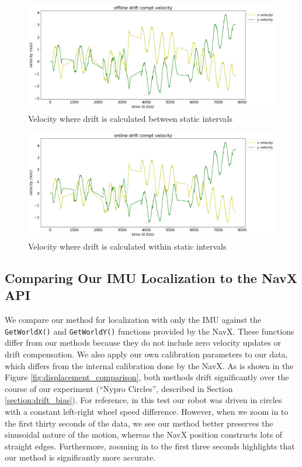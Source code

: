 \documentclass{article}
\begin{document}
      \begin{figure}[H]
        \centering
        \includegraphics[width=0.85\linewidth]{./images/offline_drift_compensation.png}
        \caption{Velocity where drift is calculated between static intervals}
        \label{fig:offline_drift_compensation}
      \end{figure}

      \begin{figure}[H]
        \centering
        \includegraphics[width=0.85\linewidth]{./images/online_drift_compensation.png}
        \caption{Velocity where drift is calculated within static intervals}
        \label{fig:online_drift_compensation}
      \end{figure}

  \subsection{Comparing Our IMU Localization to the NavX API}


		We compare our method for localization with only the IMU against the \texttt{GetWorldX()} and \texttt{GetWorldY()} functions provided by the NavX. These functions differ from our methods because they do not include zero velocity updates or drift compensation. We also apply our own calibration parameters to our data, which differs from the internal calibration done by the NavX. As is shown in the Figure \ref{fig:displacement_comparison}, both methods drift significantly over the course of our experiment (``Nypro Circles'', described in Section \ref{section:drift_bias}). For reference, in this test our robot was driven in circles with a constant left-right wheel speed difference. However, when we zoom in to the first thirty seconds of the data, we see our method better preserves the sinusoidal nature of the motion, whereas the NavX position constructs lots of straight edges. Furthermore, zooming in to the first three seconds highlights that our method is significantly more accurate.
\end{document}

